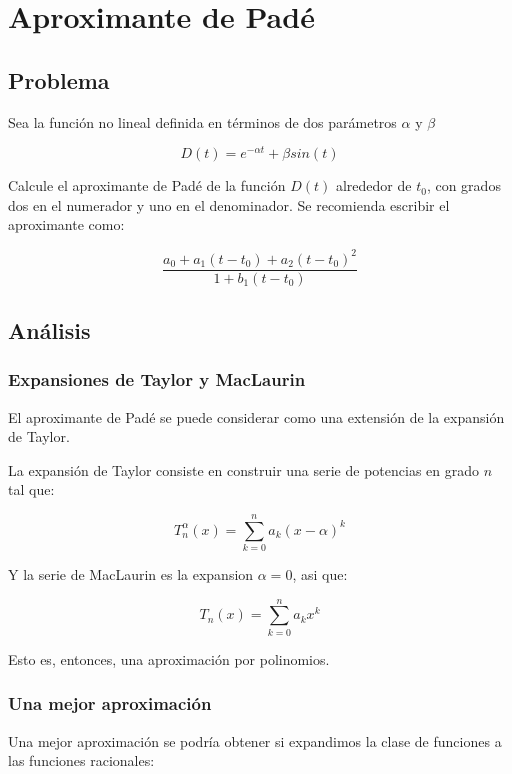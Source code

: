 \section{Aproximante de Padé}


\subsection{Problema}

Sea la función no lineal definida en términos de dos parámetros $\alpha$ y $\beta$

\begin{equation}
	D(t) = e^{-\alpha t} + \beta sin(t) 
\end{equation}

Calcule el aproximante de Padé de la función $D(t)$ alrededor de $t_0$, con grados dos en el numerador y uno en el denominador. Se recomienda escribir el aproximante como:

$$
\frac{a_0 + a_1 ( t - t_0) + a_2(t - t_0)^2 }{ 1 + b_1(t - t_0) }
$$


\subsection{Análisis}


\subsubsection{Expansiones de Taylor y MacLaurin}

El aproximante de Padé se puede considerar como una extensión de la expansión de Taylor. 

La expansión de Taylor consiste en construir una serie de potencias en grado $n$ tal que:

$$
T_n^{\alpha}(x) = \sum_{k = 0}^{n} a_k (x - \alpha)^k 
$$

Y la serie de MacLaurin es la expansion $\alpha = 0$, asi que:

$$
T_n(x) = \sum_{k = 0}^{n} a_k x^k 
$$


Esto es, entonces, una aproximación por polinomios. 


\subsubsection{Una mejor aproximación}

Una mejor aproximación se podría obtener si expandimos la clase de funciones a las funciones racionales:

